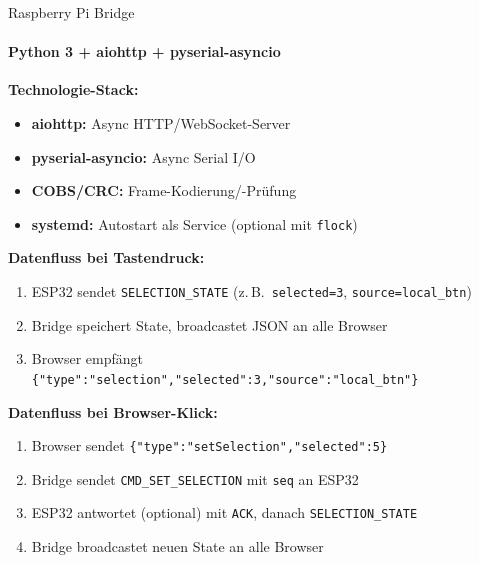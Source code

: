 \begin{frame}[fragile]{Raspberry Pi Bridge}
\framesubtitle{Python 3 + aiohttp + pyserial-asyncio}

\textbf{Technologie-Stack:}
\begin{itemize}
  \item \textbf{aiohttp:} Async HTTP/WebSocket-Server
  \item \textbf{pyserial-asyncio:} Async Serial I/O
  \item \textbf{COBS/CRC:} Frame-Kodierung/-Pr\"{u}fung
  \item \textbf{systemd:} Autostart als Service (optional mit \texttt{flock})
\end{itemize}

\vspace{0.3cm}
\textbf{Datenfluss bei Tastendruck:}
\begin{enumerate}
  \item \textcolor{ArduinoTeal}{ESP32} sendet \texttt{SELECTION\_STATE} (z.\,B.\ \texttt{selected=3}, \texttt{source=local\_btn})
  \item \textcolor{RaspberryRed}{Bridge} speichert State, broadcastet JSON an alle Browser
  \item \textcolor{SuccessGreen}{Browser} empf\"{a}ngt \verb|{"type":"selection","selected":3,"source":"local_btn"}|
\end{enumerate}

\vspace{0.3cm}
\textbf{Datenfluss bei Browser-Klick:}
\begin{enumerate}
  \item \textcolor{SuccessGreen}{Browser} sendet \verb|{"type":"setSelection","selected":5}|
  \item \textcolor{RaspberryRed}{Bridge} sendet \texttt{CMD\_SET\_SELECTION} mit \texttt{seq} an ESP32
  \item \textcolor{ArduinoTeal}{ESP32} antwortet (optional) mit \texttt{ACK}, danach \texttt{SELECTION\_STATE}
  \item \textcolor{RaspberryRed}{Bridge} broadcastet neuen State an alle Browser
\end{enumerate}
\end{frame}

